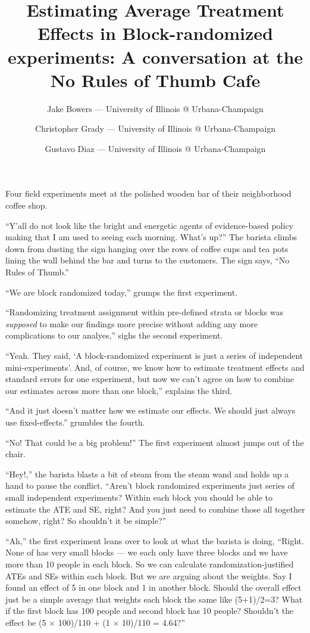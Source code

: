 \documentclass[
]{article}
\title{Estimating Average Treatment Effects in Block-randomized experiments: A conversation at the No Rules of Thumb Cafe}
\author{Jake Bowers --- University of Illinois @ Urbana-Champaign \and Christopher Grady --- University of Illinois @ Urbana-Champaign \and Gustavo Diaz --- University of Illinois @ Urbana-Champaign}
\date{}
\begin{document}
\maketitle

Four field experiments meet at the polished wooden bar of their neighborhood coffee shop.

``Y'all do not look like the bright and energetic agents of evidence-based
policy making that I am used to seeing each morning. What's up?'' The barista
climbs down from dusting the sign hanging over the rows of coffee cups and tea
pots lining the wall behind the bar and turns to the customers. The sign says,
``No Rules of Thumb.''

``We are block randomized today,'' grumps the first experiment.

``Randomizing treatment assignment within pre-defined strata or blocks was
\emph{supposed} to make our findings more precise without adding any more
complications to our analyes,'' sighs the second experiment.

``Yeah. They said, `A block-randomized experiment is just a series of
independent mini-experiments'. And, of course, we know how to estimate
treatment effects and standard errors for one experiment, but now we can't
agree on how to combine our estimates across more than one block,'' explains the
third.

``And it just doesn't matter how we estimate our effects. We should just always use fixed-effects.'' grumbles the fourth.

``No! That could be a big problem!'' The first experiment almost jumps out of the chair.

``Hey!,'' the barista blasts a bit of steam from the steam wand and holds up a
hand to pause the conflict. ``Aren't block randomized experiments just series of
small independent experiments? Within each block you should be able to estimate
the ATE and SE, right? And you just need to combine those all together somehow,
right? So shouldn't it be simple?''

``Ah,'' the first experiment leans over to look at what the barista is doing,
``Right. None of has very small blocks --- we each only have three blocks
and we have more than 10 people in each block. So we can calculate
randomization-justified ATEs and SEs within each block. But we are arguing
about the weights. Say I found an effect of 5 in one block and 1 in another
block. Should the overall effect just be a simple average that weights each block the same like (5+1)/2=3? What if the first block
has 100 people and second block has 10 people? Shouldn't the effect be (5
\(\times\) 100)/110 + (1 \(\times\) 10)/110 = 4.64?''
\end{document}
